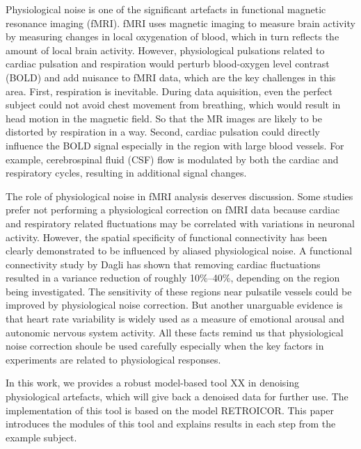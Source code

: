 Physiological noise is one of the significant artefacts in functional magnetic resonance imaging (fMRI).
fMRI uses magnetic imaging to measure brain activity by measuring changes in local oxygenation of blood, which in turn reflects the amount of local brain activity. \cite{poldrack2011handbook}
However, physiological pulsations related to cardiac pulsation and respiration would perturb blood-oxygen level contrast (BOLD) and add nuisance to fMRI data, which are the key challenges in this area. First, respiration is inevitable. 
During data aquisition, even the perfect subject could not avoid chest movement from breathing, which would result in head motion in the magnetic field. 
So that the MR images are likely to be distorted by respiration in a way.
Second, cardiac pulsation could directly influence the BOLD signal especially in the region with large blood vessels. 
For example, cerebrospinal fluid (CSF) flow is modulated by both the cardiac and respiratory cycles, resulting in additional signal changes.\cite{birn2012role}

The role of physiological noise in fMRI analysis deserves discussion. 
Some studies prefer not performing a physiological correction on fMRI data because cardiac and respiratory related fluctuations may be correlated with variations in neuronal activity.\cite{birn2012role} 
However, the spatial specificity of functional connectivity has been clearly demonstrated to be influenced by aliased physiological noise.\cite{lowe1998functional}
A functional connectivity study\cite{dagli1999localization} by Dagli has shown that removing cardiac fluctuations resulted in a variance reduction of roughly 10\%–40\%, 
depending on the region being investigated.\cite{dagli1999localization}
The sensitivity of these regions near pulsatile vessels could be improved by physiological noise correction. 
But another unarguable evidence is that heart rate variability is widely used as a measure of emotional arousal and autonomic nervous system activity.\cite{birn2012role} 
All these facts remind us that physiological noise correction shoule be used carefully especially when the key factors in experiments are related to physiological responses.

In this work, we provides a robust model-based tool XX in denoising physiological artefacts, which will give back a denoised data for further use. 
The implementation of this tool is based on the model RETROICOR.\cite{glover2000image}
This paper introduces the modules of this tool and explains results in each step from the example subject.